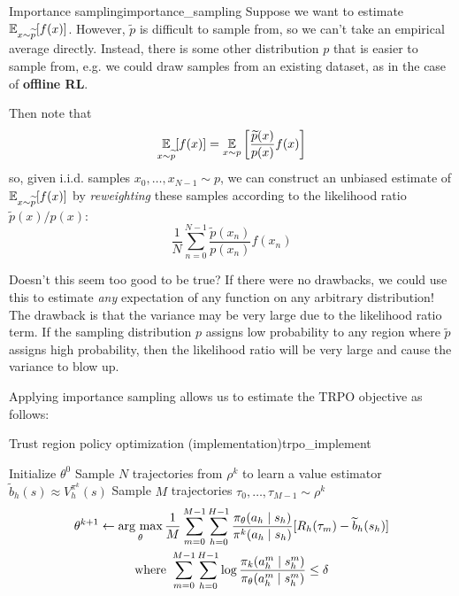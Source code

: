\documentclass[\main/main]{subfiles}
\begin{document}
\begin{definition}{Importance sampling}{importance_sampling}
    Suppose we want to estimate $\operatorname*{\mathbb{E}}_{x \sim \widetilde p}[f(x)]$.
    However, $\tilde p$ is difficult to sample from, so we can't take an empirical average directly. Instead, there is some other distribution $p$ that is easier to sample from, e.g. we could draw samples from an existing dataset, as in the case of \textbf{offline RL}.

    Then note that
    \[
        \operatorname*{\mathbb{E}}_{x \sim \widetilde p} [f(x)] = \operatorname*{\mathbb{E}}_{x \sim p}\left[ \frac{\widetilde p(x)}{p(x)} f(x) \right]
    \]
    so, given i.i.d. samples $x_0, \dots, x_{N-1} \sim p$, we can construct an unbiased estimate of $\operatorname*{\mathbb{E}}_{x \sim \widetilde p} [f(x)]$ by \emph{reweighting} these samples according to the likelihood ratio $\tilde p(x)/p(x)$:
    \[
        \frac{1}{N} \sum_{n=0}^{N-1} \frac{\tilde p(x_n)}{p(x_n)} f(x_n)
    \]

    Doesn't this seem too good to be true? If there were no drawbacks, we could use this to estimate \emph{any} expectation of any function on any arbitrary distribution!
    The drawback is that the variance may be very large due to the likelihood ratio term. If the sampling distribution $p$ assigns low probability to any region where $\tilde p$ assigns high probability, then the likelihood ratio will be very large and cause the variance to blow up.
\end{definition}

Applying importance sampling allows us to estimate the TRPO objective as follows:

\begin{definition}{Trust region policy optimization (implementation)}{trpo_implement}
    \begin{algorithmic}
        \State Initialize $\theta^0$
        \State Sample $N$ trajectories from $\rho^k$ to learn a value estimator $\tilde b_h(s) \approx V^{\pi^k}_h(s)$
        \State Sample $M$ trajectories $\tau_0, \dots, \tau_{M-1} \sim \rho^k$
        \State \begin{gather*}
            \theta^{k+1} \gets \operatorname*{\textrm{arg\ max}}_{\theta} \frac{1}{M} \sum_{m=0}^{M-1} \sum_{h=0}^{H-1} \frac{\pi_\theta(a_h \mid s_h)}{\pi^k(a_h \mid s_h)} [ R_h(\tau_m) - \widetilde b_h(s_h) ] \\
            \text{where } \sum_{m=0}^{M-1} \sum_{h=0}^{H-1} \log \frac{\pi_k(a_h^m \mid s_h^m)}{\pi_\theta(a_h^m \mid s_h^m)} \le \delta
        \end{gather*}
        \EndFor
    \end{algorithmic}
\end{definition}
\end{document}
